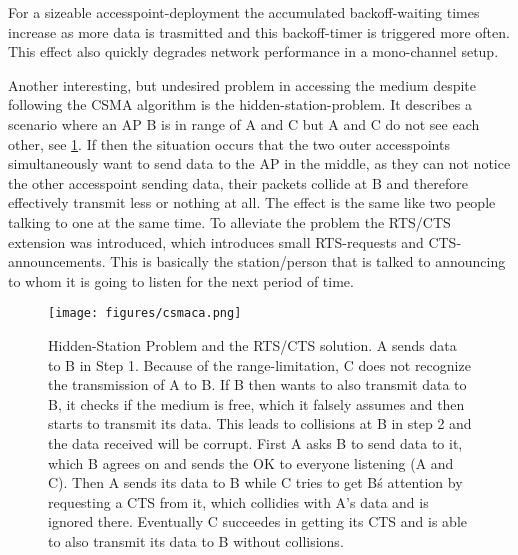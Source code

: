 	For a sizeable accesspoint-deployment the accumulated backoff-waiting times increase as more data is trasmitted and this backoff-timer is triggered more often.
	This effect also quickly degrades network performance in a mono-channel setup.
	
	Another interesting, but undesired problem in accessing the medium despite following the CSMA algorithm is the hidden-station-problem.
	It describes a scenario where an \ac{AP} B is in range of A and C but A and C do not see each other, see \ref{fig:csmaca}.
	If then the situation occurs that the two outer accesspoints simultaneously want to send data to the \ac{AP} in the middle, as they can not notice the 
	other accesspoint sending data, their packets collide at B and therefore effectively transmit less or nothing at all.
	The effect is the same like two people talking to one at the same time.
	To alleviate the problem the RTS/CTS extension was introduced, which introduces small \ac{RTS}-requests and \ac{CTS}-announcements. 
	This is basically the station/person that is talked to announcing to whom it is going to listen for the
	next period of time.
	
	\begin{figure}[th!]
	  \centering
	  \texttt{[image: figures/csmaca.png]}
	  \caption{Hidden-Station Problem and the RTS/CTS solution. A sends data to B in Step 1.
	    Because of the range-limitation, C does not recognize the transmission of A to B. 
	    If B then wants to also transmit data to B, it checks if the medium is free, which it falsely assumes
	    and then starts to transmit its data. This leads to collisions at B in step 2 and the data received will be corrupt.
	    First A asks B to send data to it, which B agrees on and sends the OK to everyone listening (A and C). 
	    Then A sends its data to B while C tries to get B\'s attention by requesting a CTS from it, which collidies with A's data and is ignored there.
	    Eventually C succeedes in getting its CTS and is able to also transmit its data to B without collisions.}
	  \label{fig:csmaca}
	\end{figure}

